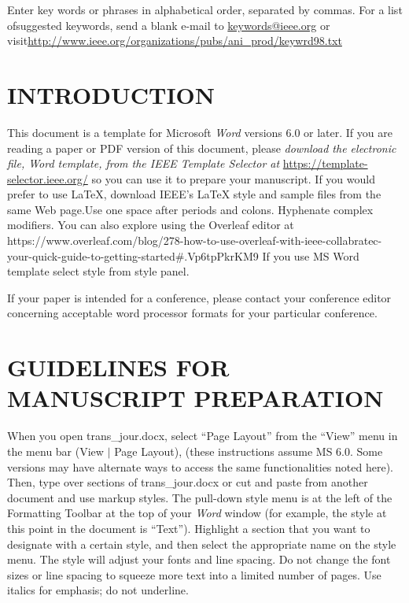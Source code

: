 \documentclass{IEEEjmw}
\begin{document}
\begin{IEEEkeywords}
Enter key words or phrases in alphabetical order, separated by commas. For a list of\goodbreak suggested keywords, send a blank e-mail to \href{mailto:keywords@ieee.org}{keywords@ieee.org} or visit\goodbreak \href{http://www.ieee.org/organizations/pubs/ani_prod/keywrd98.txt}{http://www.ieee.org/organizations/pubs/ani\_prod/keywrd98.txt}
\end{IEEEkeywords}

\maketitle

\section{INTRODUCTION}

This document is a template for Microsoft {\it Word} versions 6.0 or later. If you are reading a paper or PDF version of this document, please {\it download the electronic file, Word template, from the IEEE Template Selector at} \underline{https://template-selector.ieee.org/} so you can use it to prepare your manuscript. If you would prefer to use LaTeX, download IEEE's LaTeX style and sample files from the same Web page.Use one space after periods and colons.   Hyphenate   complex   modifiers. You can also explore using the Overleaf editor at https://www.overleaf.com/blog/278-how-to-use-overleaf-with-ieee-collabratec-your-quick-guide-to-getting-started\#.Vp6tpPkrKM9 If you  use  MS  Word  template select style from style panel.

If your paper is intended for a conference, please contact your conference editor concerning acceptable word processor formats for your particular conference.\vspace*{-1pt}

\section{GUIDELINES FOR MANUSCRIPT PREPARATION}

When you open trans\_jour.docx, select ``Page Layout'' from the ``View'' menu in the menu bar (View $|$ Page Layout), (these instructions assume MS 6.0. Some versions may have alternate ways to access the same functionalities noted here). Then, type over sections of trans\_jour.docx or cut and paste from another document and use markup styles. The pull-down style menu is at the left of the Formatting Toolbar at the top of your {\it Word} window (for example, the style at this point in the document is ``Text''). Highlight a section\vadjust{\vfill\pagebreak} that you want to designate with a certain style, and then select the appropriate name on the style menu. The style will adjust your fonts and line spacing. Do not change the font sizes or line spacing to squeeze more text into a limited number of pages. Use italics for emphasis; do not underline.
\end{document}
